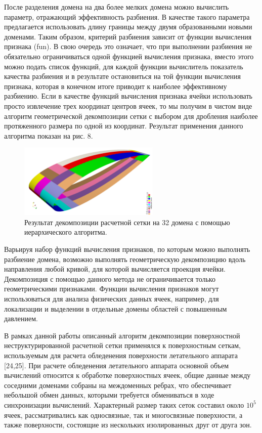 После разделения домена на два более мелких домена можно вычислить параметр, отражающий эффективность разбиения.
В качестве такого параметра предлагается использовать длину границы между двумя образованными новыми доменами.
Таким образом, критерий разбиения зависит от функции вычисления признака (fun).
В свою очередь это означает, что при выполнении разбиения не обязательно ограничиваться одной функцией вычисления признака, вместо этого можно подать список функций, для каждой функции вычислитель показатель качества разбиения и в результате остановиться на той функции вычисления признака, которая в конечном итоге приводит к наиболее эффективному разбиению.
Если в качестве функций вычисления признака ячейки использовать просто извлечение трех координат центров ячеек, то мы получим в чистом виде алгоритм геометрической декомпозиции сетки с выбором для дробления наиболее протяженного размера по одной из координат.
Результат применения данного алгоритма показан на рис. 8.

\begin{figure}[ht]
	\centering
		\includegraphics[width=0.6\textwidth]{./pics/text_2_decompsurf/wing_hierarchical_32.png}
	\caption{Результат декомпозиции расчетной сетки на 32 домена с помощью иерархического алгоритма.}
	\label{fig:text_2_decompsurf_wing_hierarchical_32}
\end{figure}

Варьируя набор функций вычисления признаков, по которым можно выполнять разбиение домена, возможно выполнять геометрическую декомпозицию вдоль направления любой кривой, для которой вычисляется проекция ячейки.
Декомпозиция с помощью данного метода не ограничивается только геометрическими признаками.
Функции вычисления признаков могут использоваться для анализа физических данных ячеек, например, для локализации и выделении в отдельные домены областей с повышенным давлением.

В рамках данной работы описанный алгоритм декомпозиции поверхностной неструктурированной расчетной сетки применялся к поверхностным сеткам, используемым для расчета обледенения поверхности летательного аппарата [24,25].
При расчете обледенения летательного аппарата основной объем вычислений относится к обработке поверхностных ячеек, общие данные между соседними доменами собраны на междоменных ребрах, что обеспечивает небольшой обмен данных, которыми требуется обмениваться в ходе синхронизации вычислений.
Характерный размер таких сеток составил около $10^5$ ячеек, рассматривались как односвязные, так и многосвязные поверхности, а также поверхности, состоящие из нескольких изолированных друг от друга зон.

